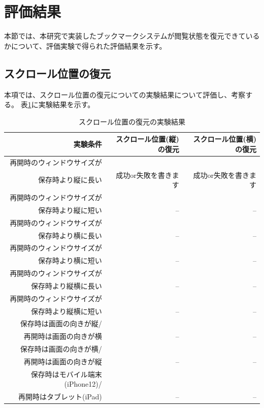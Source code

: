 \section{評価結果}
本節では、本研究で実装したブックマークシステムが閲覧状態を復元できているかについて、評価実験で得られた評価結果を示す。

\subsection{スクロール位置の復元}
本項では、スクロール位置の復元についての実験結果について評価し、考察する。
表\ref{tb:evl-result-scroll-position}に実験結果を示す。

\begin{table}[htbp]
  \caption{スクロール位置の復元の実験結果}
  \label{tb:evl-result-scroll-position}
  \begin{center}
    \begin{tabular}{rrr}
      \hline
      実験条件 & スクロール位置(縦)の復元 & スクロール位置(横)の復元 \\ \hline \hline
      再開時のウィンドウサイズが\\
      保存時より縦に長い & 成功or失敗を書きます & 成功or失敗を書きます \\ \hline
      再開時のウィンドウサイズが\\
      保存時より縦に短い & -- & -- \\ \hline
      再開時のウィンドウサイズが\\
      保存時より横に長い & -- & -- \\ \hline
      再開時のウィンドウサイズが\\
      保存時より横に短い & -- & -- \\ \hline
      再開時のウィンドウサイズが\\
      保存時より縦横に長い & -- & -- \\ \hline
      再開時のウィンドウサイズが\\
      保存時より縦横に短い & -- & -- \\ \hline
      保存時は画面の向きが縦/\\
      再開時は画面の向きが横 & -- & -- \\ \hline
      保存時は画面の向きが横/\\
      再開時は画面の向きが縦 & -- & -- \\ \hline
      保存時はモバイル端末(iPhone12)/\\
      再開時はタブレット(iPad) & -- & -- \\ \hline

\end{tabular}
\end{center}
\end{table}
